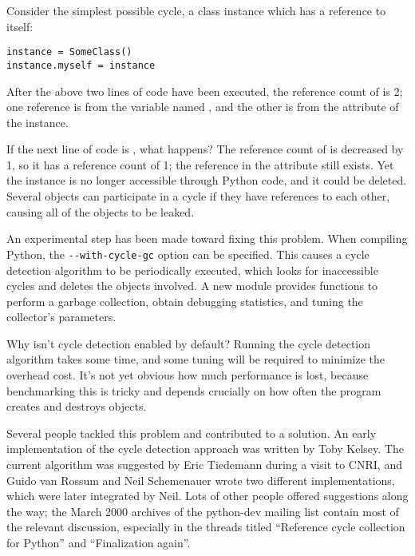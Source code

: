 \documentclass{howto}
\begin{document}
Consider the simplest possible cycle, 
a class instance which has a reference to itself:

\begin{verbatim}
instance = SomeClass()
instance.myself = instance
\end{verbatim}

After the above two lines of code have been executed, the reference
count of  is 2; one reference is from the variable
named , and the other is from the 
attribute of the instance.  

If the next line of code is , what happens?  The
reference count of  is decreased by 1, so it has a
reference count of 1; the reference in the  attribute
still exists.  Yet the instance is no longer accessible through Python
code, and it could be deleted.  Several objects can participate in a
cycle if they have references to each other, causing all of the
objects to be leaked.

An experimental step has been made toward fixing this problem.  When
compiling Python, the \verb|--with-cycle-gc| option can be specified.
This causes a cycle detection algorithm to be periodically executed,
which looks for inaccessible cycles and deletes the objects involved.
A new  module provides functions to perform a garbage
collection, obtain debugging statistics, and tuning the collector's parameters.

Why isn't cycle detection enabled by default?  Running the cycle detection
algorithm takes some time, and some tuning will be required to
minimize the overhead cost.  It's not yet obvious how much performance
is lost, because benchmarking this is tricky and depends crucially
on how often the program creates and destroys objects. 

Several people tackled this problem and contributed to a solution.  An
early implementation of the cycle detection approach was written by
Toby Kelsey.  The current algorithm was suggested by Eric Tiedemann
during a visit to CNRI, and Guido van Rossum and Neil Schemenauer
wrote two different implementations, which were later integrated by
Neil.  Lots of other people offered suggestions along the way; the
March 2000 archives of the python-dev mailing list contain most of the
relevant discussion, especially in the threads titled ``Reference
cycle collection for Python'' and ``Finalization again''.

\end{document}
